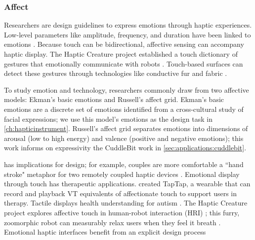 

\subsubsection{Affect}
Researchers are  design guidelines to express emotions through haptic experiences.
Low-level parameters like amplitude, frequency, and duration have been linked to emotions \cite{YongjaeYoo2015} 
\cite{Obrist2015}.
Because touch can be bidirectional, affective sensing can accompany haptic display.
The Haptic Creature project established a touch dictionary of gestures that emotionally communicate with robots \cite{Yohanan2011affectivetouch}.
Touch-based surfaces can detect these gestures \cite{Flagg2013} through technologies like conductive fur and fabric \cite{Flagg2012}.

To study emotion and technology, researchers commonly draw from two affective models:
Ekman's basic emotions and Russell's affect grid.
Ekman's basic emotions \cite{Ekman1992,Ekman1971} are a discrete set of emotions identified from a cross-cultural study of facial expressions; we use this model's emotions as the design task in \autoref{ch:hapticinstrument}.
Russell's affect grid \cite{Russell1989circumplexmodel,Russell1989affectgrid} separates emotions into dimensions of arousal (low to high energy) and valence (positive and negative emotions); this work informs  %
on expressivity the CuddleBit work in \autoref{sec:applications:cuddlebit}.

 has implications for design;
for example, couples are more comfortable  a ``hand stroke" metaphor for two remotely coupled haptic devices \cite{Smith2007}.
Emotional display through touch has therapeutic applications.
\citet{Bonanni2006} created TapTap, a wearable that can record and playback VT equivalents of affectionate touch to support users in therapy.
Tactile displays  health \cite{Vaucelle2009}  understanding for autism \cite{Changeon2012}.
The Haptic Creature project explores affective touch in human-robot interaction (HRI) \cite{Yohanan2005,Yohanan2009,Yohanan2011affectivetouch,Yohanan2011affectdisplay};
this furry, zoomorphic robot can measurably relax users when they feel it breath \cite{Sefidgar2016}.
Emotional haptic interfaces benefit from an explicit design process





